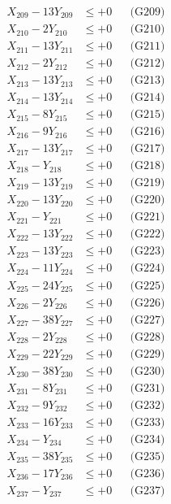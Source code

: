 \documentclass[a4paper,10pt]{article}
\begin{document}
{\begin{align}
X_{209} - 13Y_{209} &\leq +0 && \text{(G209)} \\
X_{210} - 2Y_{210} &\leq +0 && \text{(G210)} \\
X_{211} - 13Y_{211} &\leq +0 && \text{(G211)} \\
X_{212} - 2Y_{212} &\leq +0 && \text{(G212)} \\
X_{213} - 13Y_{213} &\leq +0 && \text{(G213)} \\
X_{214} - 13Y_{214} &\leq +0 && \text{(G214)} \\
X_{215} - 8Y_{215} &\leq +0 && \text{(G215)} \\
X_{216} - 9Y_{216} &\leq +0 && \text{(G216)} \\
X_{217} - 13Y_{217} &\leq +0 && \text{(G217)} \\
\allowbreak
X_{218} - Y_{218} &\leq +0 && \text{(G218)} \\
X_{219} - 13Y_{219} &\leq +0 && \text{(G219)} \\
X_{220} - 13Y_{220} &\leq +0 && \text{(G220)} \\
X_{221} - Y_{221} &\leq +0 && \text{(G221)} \\
X_{222} - 13Y_{222} &\leq +0 && \text{(G222)} \\
X_{223} - 13Y_{223} &\leq +0 && \text{(G223)} \\
X_{224} - 11Y_{224} &\leq +0 && \text{(G224)} \\
X_{225} - 24Y_{225} &\leq +0 && \text{(G225)} \\
X_{226} - 2Y_{226} &\leq +0 && \text{(G226)} \\
X_{227} - 38Y_{227} &\leq +0 && \text{(G227)} \\
\allowbreak
X_{228} - 2Y_{228} &\leq +0 && \text{(G228)} \\
X_{229} - 22Y_{229} &\leq +0 && \text{(G229)} \\
X_{230} - 38Y_{230} &\leq +0 && \text{(G230)} \\
X_{231} - 8Y_{231} &\leq +0 && \text{(G231)} \\
X_{232} - 9Y_{232} &\leq +0 && \text{(G232)} \\
X_{233} - 16Y_{233} &\leq +0 && \text{(G233)} \\
X_{234} - Y_{234} &\leq +0 && \text{(G234)} \\
X_{235} - 38Y_{235} &\leq +0 && \text{(G235)} \\
X_{236} - 17Y_{236} &\leq +0 && \text{(G236)} \\
X_{237} - Y_{237} &\leq +0 && \text{(G237)} \\
\allowbreak

\end{align}}
\end{document}
